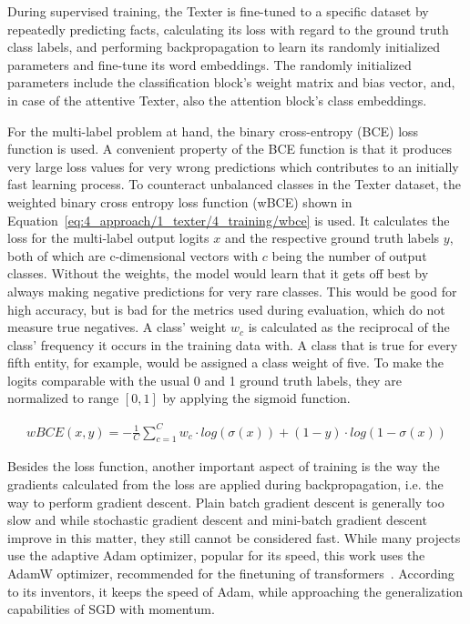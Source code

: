 During supervised training, the Texter is fine-tuned to a specific dataset by repeatedly predicting facts, calculating its loss with regard to the ground truth class labels, and performing backpropagation to learn its randomly initialized parameters and fine-tune its word embeddings. The randomly initialized parameters include the classification block's weight matrix and bias vector, and, in case of the attentive Texter, also the attention block's class embeddings.

For the multi-label problem at hand, the binary cross-entropy (BCE) loss function is used. A convenient property of the BCE function is that it produces very large loss values for very wrong predictions which contributes to an initially fast learning process. To counteract unbalanced classes in the Texter dataset, the weighted binary cross entropy loss function (wBCE) shown in Equation~\ref{eq:4_approach/1_texter/4_training/wbce} is used. It calculates the loss for the multi-label output logits $x$ and the respective ground truth labels $y$, both of which are c-dimensional vectors with $c$ being the number of output classes. Without the weights, the model would learn that it gets off best by always making negative predictions for very rare classes. This would be good for high accuracy, but is bad for the metrics used during evaluation, which do not measure true negatives. A class' weight $w_c$ is calculated as the reciprocal of the class' frequency it occurs in the training data with. A class that is true for every fifth entity, for example, would be assigned a class weight of five. To make the logits comparable with the usual 0 and 1 ground truth labels, they are normalized to range $[0, 1]$ by applying the sigmoid function.

\begin{align}
    wBCE(x, y) = - \frac{1}{C} \sum_{c = 1}^C w_c \cdot log(\sigma(x)) + (1 - y) \cdot log(1 - \sigma(x))
    \label{eq:4_approach/1_texter/4_training/wbce}
\end{align}

Besides the loss function, another important aspect of training is the way the gradients calculated from the loss are applied during backpropagation, i.e. the way to perform gradient descent. Plain batch gradient descent is generally too slow and while stochastic gradient descent and mini-batch gradient descent improve in this matter, they still cannot be considered fast. While many projects use the adaptive Adam optimizer, popular for its speed, this work uses the AdamW optimizer, recommended for the finetuning of transformers~\cite{Loshchilov2019DecoupledWD}. According to its inventors, it keeps the speed of Adam, while approaching the generalization capabilities of SGD with momentum.
